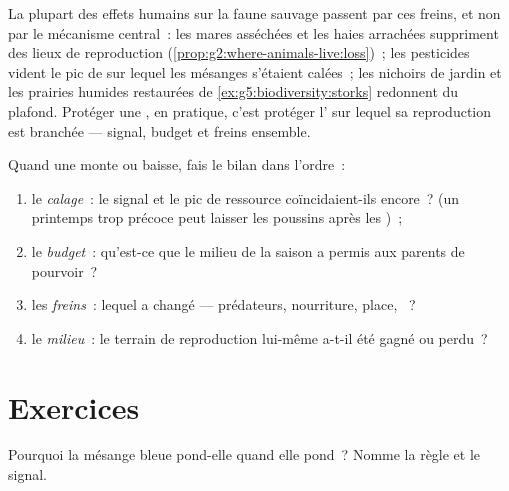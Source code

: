 \begin{remark}\label{rem:g8:reproduction-and-environment:humans}
La plupart des effets humains sur la faune sauvage passent par ces
freins, et non par le mécanisme central~: les mares asséchées et les
haies arrachées suppriment des lieux de reproduction
(\cref{prop:g2:where-animals-live:loss})~; les pesticides vident le
pic de  sur lequel les mésanges s'étaient calées~; les
nichoirs de jardin et les prairies humides restaurées de
\cref{ex:g5:biodiversity:storks} redonnent du plafond. Protéger une
, en pratique, c'est protéger l' sur lequel sa
reproduction est branchée --- signal, budget et freins ensemble.
\end{remark}

\begin{method}\label{met:g8:reproduction-and-environment:audit}
Quand une  monte ou baisse, fais le bilan dans l'ordre~:
\begin{enumerate}
  \item le \emph{calage}~: le signal et le pic de ressource
        coïncidaient-ils encore~? (un printemps trop précoce peut
        laisser les poussins après les )~;
  \item le \emph{budget}~: qu'est-ce que le milieu de la saison a
        permis aux parents de pourvoir~?
  \item les \emph{freins}~: lequel a changé --- prédateurs,
        nourriture, place, ~?
  \item le \emph{milieu}~: le terrain de reproduction lui-même
        a-t-il été gagné ou perdu~?
\end{enumerate}
\end{method}

\section{Exercices}

\begin{exercise}[$\star$]\label{exo:g8:reproduction-and-environment:1}
Pourquoi la mésange bleue pond-elle quand elle pond~? Nomme la règle
et le signal.
\end{exercise}


